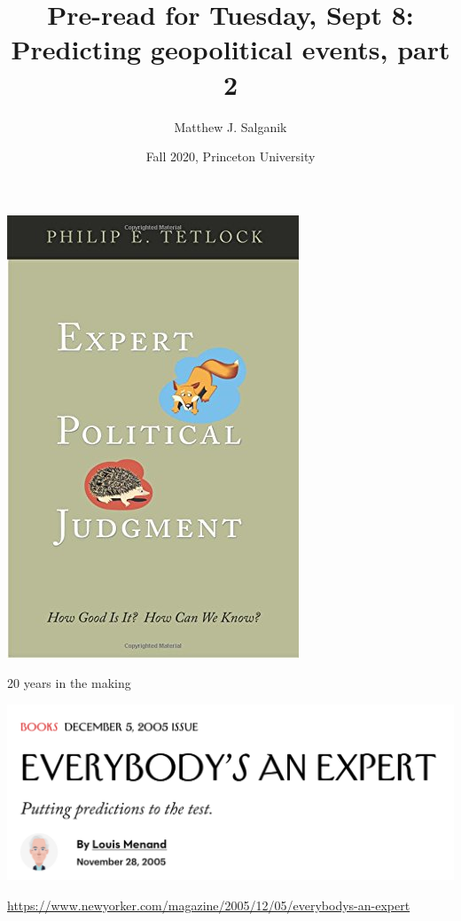 \documentclass{beamer}
\title[]{Pre-read for Tuesday, Sept 8: Predicting geopolitical events, part 2}
\author[]{Matthew J. Salganik}
\institute[]{COS 597E/SOC 555 Limits to prediction}
\date[]{Fall 2020, Princeton University}
\begin{document}
\frame{\titlepage}
\begin{frame}
\frametitle{}

\begin{center}
\includegraphics[height=0.7\textheight]{figures/tetlock_expert_2005_cover}
\end{center}

\vfill
20 years in the making

\end{frame}
\begin{frame}

\begin{center}
\includegraphics[width=0.7\textheight]{figures/menand_everybodys_2005_title}
\end{center}

\vfill
\url{https://www.newyorker.com/magazine/2005/12/05/everybodys-an-expert}

\end{frame}
\end{document}
